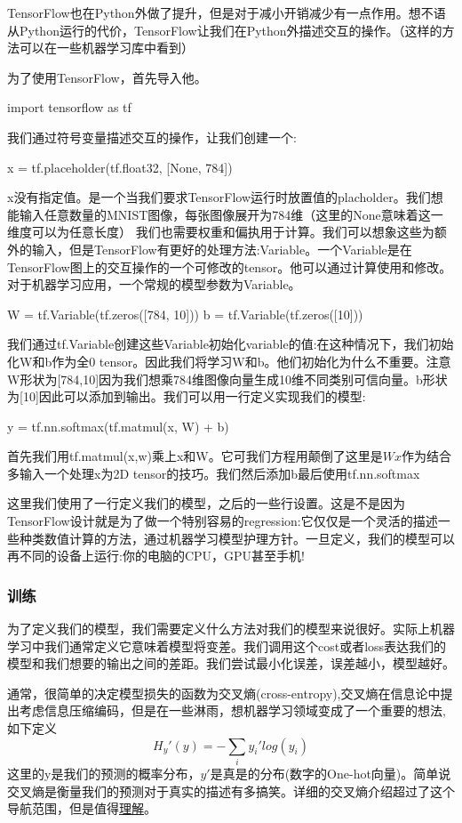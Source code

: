 TensorFlow也在Python外做了提升，但是对于减小开销减少有一点作用。想不语从Python运行的代价，TensorFlow让我们在Python外描述交互的操作。（这样的方法可以在一些机器学习库中看到）

为了使用TensorFlow，首先导入他。
\begin{ipythoncode}
import tensorflow as tf 
\end{ipythoncode}
我们通过符号变量描述交互的操作，让我们创建一个:
\begin{ipythoncode}
x = tf.placeholder(tf.float32, [None, 784])
\end{ipythoncode}
x没有指定值。是一个当我们要求TensorFlow运行时放置值的placholder。我们想能输入任意数量的MNIST图像，每张图像展开为784维（这里的None意味着这一维度可以为任意长度）
我们也需要权重和偏执用于计算。我们可以想象这些为额外的输入，但是TensorFlow有更好的处理方法:Variable。一个Variable是在TensorFlow图上的交互操作的一个可修改的tensor。他可以通过计算使用和修改。对于机器学习应用，一个常规的模型参数为Variable。
\begin{pythoncode}
W = tf.Variable(tf.zeros([784, 10]))
b = tf.Variable(tf.zeros([10]))
\end{pythoncode}
我们通过tf.Variable创建这些Variable初始化variable的值:在这种情况下，我们初始化W和b作为全0 tensor。因此我们将学习W和b。他们初始化为什么不重要。注意W形状为[784,10]因为我们想乘784维图像向量生成10维不同类别可信向量。b形状为[10]因此可以添加到输出。我们可以用一行定义实现我们的模型:
\begin{pythoncode}
y = tf.nn.softmax(tf.matmul(x, W) + b)
\end{pythoncode}
首先我们用tf.matmul(x,w)乘上x和W。它可我们方程用颠倒了这里是$Wx$作为结合多输入一个处理x为2D tensor的技巧。我们然后添加b最后使用tf.nn.softmax

这里我们使用了一行定义我们的模型，之后的一些行设置。这是不是因为TensorFlow设计就是为了做一个特别容易的regression:它仅仅是一个灵活的描述一些种类数值计算的方法，通过机器学习模型护理方针。一旦定义，我们的模型可以再不同的设备上运行:你的电脑的CPU，GPU甚至手机!

\subsubsection{训练}
为了定义我们的模型，我们需要定义什么方法对我们的模型来说很好。实际上机器学习中我们通常定义它意味着模型将变差。我们调用这个cost或者loss表达我们的模型和我们想要的输出之间的差距。我们尝试最小化误差，误差越小，模型越好。

通常，很简单的决定模型损失的函数为交叉熵(cross-entropy),交叉熵在信息论中提出考虑信息压缩编码，但是在一些淋雨，想机器学习领域变成了一个重要的想法,如下定义
\[H_y'(y)=-\sum_iy_i'log(y_i)\]
这里的y是我们的预测的概率分布，$y'$是真是的分布(数字的One-hot向量)。简单说交叉熵是衡量我们的预测对于真实的描述有多搞笑。详细的交叉熵介绍超过了这个导航范围，但是值得\href{https://colah.github.io/posts/2015-09-Visual-Information}{理解}。

